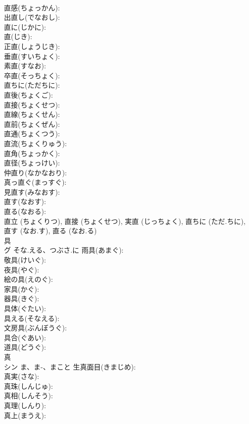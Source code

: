 \documentclass[8pt]{extreport}
\begin{document}
\begin{CJK}{UTF8}{min}
\\	直感(ちょっかん): 
\\	出直し(でなおし): 
\\	直に(じかに): 
\\	直(じき): 
\\	正直(しょうじき): 
\\	垂直(すいちょく): 
\\	素直(すなお): 
\\	卒直(そっちょく): 
\\	直ちに(ただちに): 
\\	直後(ちょくご): 
\\	直接(ちょくせつ): 
\\	直線(ちょくせん): 
\\	直前(ちょくぜん): 
\\	直通(ちょくつう): 
\\	直流(ちょくりゅう): 
\\	直角(ちょっかく): 
\\	直径(ちょっけい): 
\\	仲直り(なかなおり): 
\\	真っ直ぐ(まっすぐ): 
\\	見直す(みなおす): 
\\	直す(なおす): 
\\	直る(なおる): 
\\	直立 (ちょくりつ), 直接 (ちょくせつ), 実直 (じっちょく), 直ちに (ただ.ちに), 直す (なお.す), 直る (なお.る)
\\	具			
\\	グ	そな.える、つぶさ.に	雨具(あまぐ): 
\\	敬具(けいぐ): 
\\	夜具(やぐ): 
\\	絵の具(えのぐ): 
\\	家具(かぐ): 
\\	器具(きぐ): 
\\	具体(ぐたい): 
\\	具える(そなえる): 
\\	文房具(ぶんぼうぐ): 
\\	具合(ぐあい): 
\\	道具(どうぐ): 
\\	真			
\\	シン	ま、ま-、まこと	生真面目(きまじめ): 
\\	真実(さな): 
\\	真珠(しんじゅ): 
\\	真相(しんそう): 
\\	真理(しんり): 
\\	真上(まうえ): 

\end{CJK}
\end{document}
